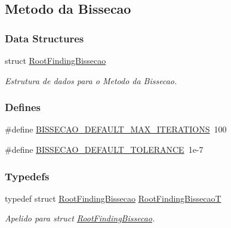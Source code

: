 \hypertarget{group____bissecao}{
\subsection{Metodo da Bissecao}
\label{group____bissecao}
}
\subsubsection*{Data Structures}
\begin{CompactItemize}
\item 
struct \hyperlink{structRootFindingBissecao}{RootFindingBissecao}
\begin{CompactList}\small\item\em Estrutura de dados para o Metodo da Bissecao. \item\end{CompactList}\end{CompactItemize}
\subsubsection*{Defines}
\begin{CompactItemize}
\item 
\#define \hyperlink{group____bissecao_g35fa37eaf728f4216a2b5b0ed5a9c685}{BISSECAO\_\-DEFAULT\_\-MAX\_\-ITERATIONS}~100
\item 
\#define \hyperlink{group____bissecao_g69c6773347f58386687f3b4bcdad0e01}{BISSECAO\_\-DEFAULT\_\-TOLERANCE}~1e-7
\end{CompactItemize}
\subsubsection*{Typedefs}
\begin{CompactItemize}
\item 
typedef struct \hyperlink{structRootFindingBissecao}{RootFindingBissecao} \hyperlink{group____bissecao_gb3511b238887380d8ad7579693f400d1}{RootFindingBissecaoT}
\begin{CompactList}\small\item\em Apelido para struct \hyperlink{structRootFindingBissecao}{RootFindingBissecao}. \item\end{CompactList}\end{CompactItemize}
